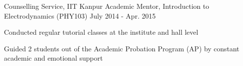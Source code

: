 \begin{cventries}
	\cventry
	{Counselling Service, IIT Kanpur} %
	{Academic Mentor, Introduction to Electrodynamics (PHY103)} %
	{July 2014 - Apr. 2015} %
	{} %
	{
		\begin{cvitems} %
			\item {Conducted regular tutorial classes at the institute and hall level}
			\item {Guided 2 students out of the Academic Probation Program (AP) by constant academic and emotional support }
		\end{cvitems}
	}
\end{cventries}

